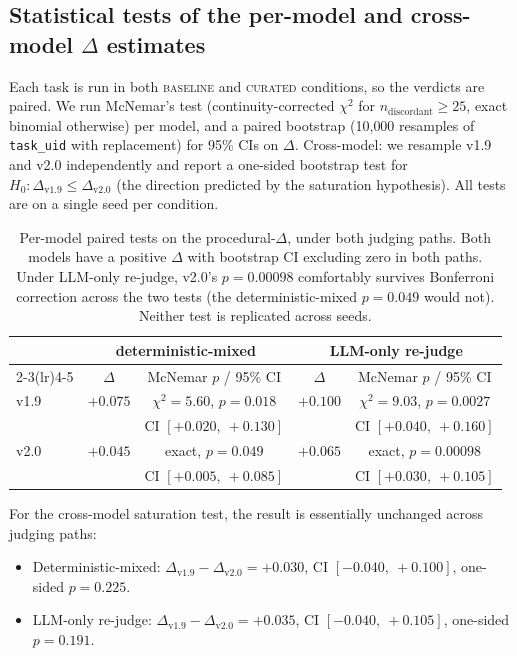 \documentclass[10pt]{article}
\newcommand{\BL}{\textsc{baseline}\xspace}
\newcommand{\CU}{\textsc{curated}\xspace}
\begin{document}
\subsection{Statistical tests of the per-model and cross-model $\Delta$ estimates}\label{sec:stats}

Each task is run in both \BL{} and \CU{} conditions, so the verdicts are paired. We run McNemar's test (continuity-corrected $\chi^2$ for $n_{\mathrm{discordant}} \geq 25$, exact binomial otherwise) per model, and a paired bootstrap (10{,}000 resamples of \texttt{task\_uid} with replacement) for 95\% CIs on $\Delta$. Cross-model: we resample v1.9 and v2.0 independently and report a one-sided bootstrap test for $H_0\!: \Delta_{\mathrm{v1.9}} \leq \Delta_{\mathrm{v2.0}}$ (the direction predicted by the saturation hypothesis). All tests are on a single seed per condition.

\begin{table}[h]
\centering
\small
\begin{tabular}{@{}l c c c c@{}}
\toprule
& \multicolumn{2}{c}{\textbf{deterministic-mixed}} & \multicolumn{2}{c}{\textbf{LLM-only re-judge}} \\
\cmidrule(lr){2-3}\cmidrule(lr){4-5}
& $\Delta$ & McNemar $p$ / 95\% CI & $\Delta$ & McNemar $p$ / 95\% CI \\
\midrule
v1.9 & $+0.075$ & $\chi^2{=}5.60$, $p{=}0.018$ & $+0.100$ & $\chi^2{=}9.03$, $p{=}0.0027$ \\
     &          & CI $[+0.020,\ +0.130]$       &          & CI $[+0.040,\ +0.160]$ \\
v2.0 & $+0.045$ & exact, $p{=}0.049$           & $+0.065$ & exact, $p{=}0.00098$ \\
     &          & CI $[+0.005,\ +0.085]$       &          & CI $[+0.030,\ +0.105]$ \\
\bottomrule
\end{tabular}
\caption{Per-model paired tests on the procedural-$\Delta$, under both judging paths. Both models have a positive $\Delta$ with bootstrap CI excluding zero in both paths. Under LLM-only re-judge, v2.0's $p{=}0.00098$ comfortably survives Bonferroni correction across the two tests (the deterministic-mixed $p{=}0.049$ would not). Neither test is replicated across seeds.}
\label{tab:stats-per-model}
\end{table}

For the cross-model saturation test, the result is essentially unchanged across judging paths:
\begin{itemize}[leftmargin=*,nosep]
  \item Deterministic-mixed: $\Delta_{\mathrm{v1.9}} - \Delta_{\mathrm{v2.0}} = +0.030$, CI $[-0.040,\ +0.100]$, one-sided $p = 0.225$.
  \item LLM-only re-judge: $\Delta_{\mathrm{v1.9}} - \Delta_{\mathrm{v2.0}} = +0.035$, CI $[-0.040,\ +0.105]$, one-sided $p = 0.191$.
\end{itemize}
\end{document}
